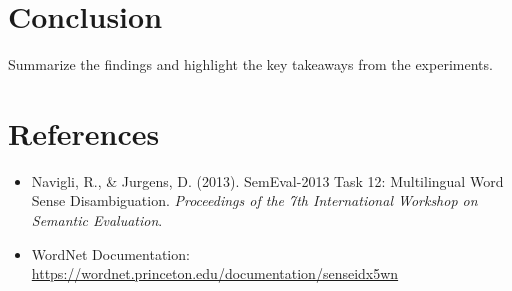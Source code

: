 \documentclass[11pt]{article}
\begin{document}
\section{Conclusion}
Summarize the findings and highlight the key takeaways from the experiments.

\section*{References}
\begin{itemize}
    \item Navigli, R., \& Jurgens, D. (2013). SemEval-2013 Task 12: Multilingual Word Sense Disambiguation. \emph{Proceedings of the 7th International Workshop on Semantic Evaluation}.
    \item WordNet Documentation: \url{https://wordnet.princeton.edu/documentation/senseidx5wn}
\end{itemize}
\end{document}
